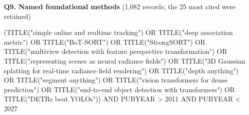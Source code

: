 \par\medskip\noindent\textbf{Q9. Named foundational methods} (1,082 records; the 25 most cited were retained)\par\nobreak\smallskip
{\noindent\scriptsize\ttfamily\raggedright (TITLE("simple online and realtime tracking") OR TITLE("deep association metric") OR TITLE("BoT-SORT") OR TITLE("StrongSORT") OR TITLE("multiview detection with feature perspective transformation") OR TITLE("representing scenes as neural radiance fields") OR TITLE("3D Gaussian splatting for real-time radiance field rendering") OR TITLE("depth anything") OR TITLE("segment anything") OR TITLE("vision transformers for dense prediction") OR TITLE("end-to-end object detection with transformers") OR TITLE("DETRs beat YOLOs")) AND PUBYEAR > 2011 AND PUBYEAR < 2027\par}
